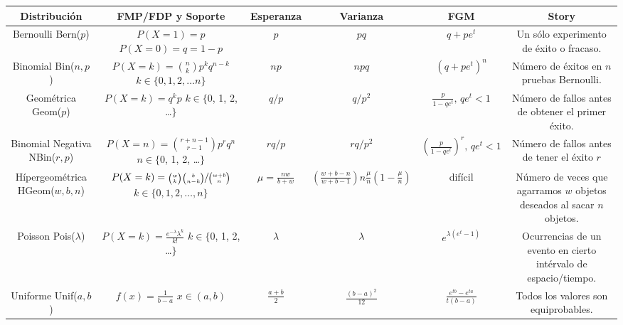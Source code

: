 \documentclass[12,landscape]{article}
\newcommand{\Bern}{\textrm{Bern}}
\newcommand{\Bin}{\textrm{Bin}}
\newcommand{\Pois}{\textrm{Pois}}
\newcommand{\Unif}{\textrm{Unif}}
\newcommand{\Geom}{\textrm{Geom}}
\newcommand{\NBin}{\textrm{NBin}}
\newcommand{\Hypergeometric}{\textrm{HGeom}}
\begin{document}
\begin{center}
\renewcommand{\arraystretch}{3.7}
\begin{tabular}{cccccc}
\textbf{Distribución} & \textbf{FMP/FDP y Soporte} & \textbf{Esperanza}  & \textbf{Varianza} & \textbf{FGM} & \textbf{Story}\\
\hline 
\shortstack{Bernoulli \\ \Bern($p$)} & \shortstack{$P(X=1) = p$ \\$ P(X=0) = q=1-p$} & $p$ & $pq$ & $q + pe^t$ & Un sólo experimento de éxito o fracaso.\\
\hline
\shortstack{Binomial \\ \Bin($n, p$)} & \shortstack{$P(X=k) = {n \choose k}p^k q^{n-k}$  \\ $k \in \{0, 1, 2, \dots n\}$}& $np$ & $npq$ & $(q + pe^t)^n$ & Número de éxitos en $n$ pruebas Bernoulli.\\
\hline
\shortstack{Geométrica \\ \Geom($p$)} & \shortstack{$P(X=k) = q^kp$  \\ $k \in \{$0, 1, 2, \dots $\}$}& $q/p$ & $q/p^2$ & $\frac{p}{1-qe^t}, \, qe^t < 1$ & Número de fallos antes de obtener el primer éxito.\\
\hline
\shortstack{Binomial Negativa \\ \NBin($r, p$)} & \shortstack{$P(X=n) = {r + n - 1 \choose r -1}p^rq^n$ \\ $n \in \{$0, 1, 2, \dots $\}$} & $rq/p$ & $rq/p^2$ &  $(\frac{p}{1-qe^t})^r, \, qe^t < 1$ & Número de fallos antes de tener el éxito $r$\\
\hline
\shortstack{Hípergeométrica \\ \Hypergeometric($w, b, n$)} & \shortstack{$P(X=k) = \sfrac{{w \choose k}{b \choose n-k}}{{w + b \choose n}}$ \\ $k \in \{0, 1, 2, \dots,  n\}$} & $\mu = \frac{nw}{b+w}$ &$\left(\frac{w+b-n}{w+b-1} \right) n\frac{\mu}{n}(1 - \frac{\mu}{n})$& difícil & Número de veces que agarramos $w$ objetos deseados al sacar $n$ objetos.\\
\hline
\shortstack{Poisson \\ \Pois($\lambda$)} & \shortstack{$P(X=k) = \frac{e^{-\lambda}\lambda^k}{k!}$ \\ $k \in \{$0, 1, 2, \dots $\}$} & $\lambda$ & $\lambda$ & $e^{\lambda(e^t-1)}$ & Ocurrencias de un evento en cierto intérvalo de espacio/tiempo.\\
\hline
\hline
\shortstack{Uniforme \\ \Unif($a, b$)} & \shortstack{$ f(x) = \frac{1}{b-a}$ \\$ x \in (a, b) $} & $\frac{a+b}{2}$ & $\frac{(b-a)^2}{12}$ &  $\frac{e^{tb}-e^{ta}}{t(b-a)}$ & Todos los valores son equiprobables.\\

\end{tabular}
\end{center}
\end{document}
